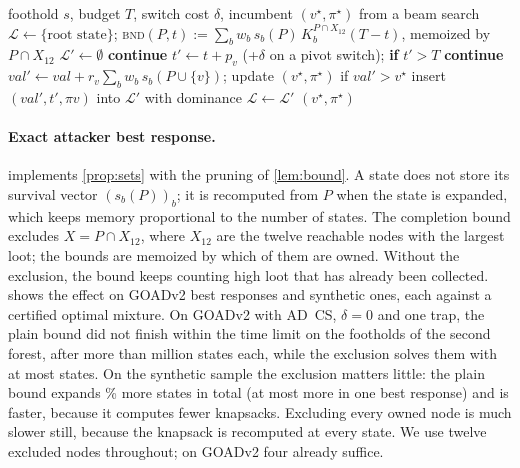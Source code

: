 \documentclass[runningheads]{llncs}
\begin{document}
\begin{algorithm}[t]
\caption{Exact attacker best response against a trap mixture $D=\{(w_b,B_b)\}$}\label{alg:dp}
\begin{algorithmic}[1]
\Require foothold $s$, budget $T$, switch cost $\delta$, incumbent $(v^\star,\pi^\star)$ from a beam search
\State $\mathcal L\gets\{\text{root state}\}$; \textsc{bnd}$(P,t)\mathrel{:=}\sum_b w_b\,s_b(P)\,K_b^{P\cap X_{12}}(T-t)$, memoized by $P\cap X_{12}$
  \State $\mathcal L'\gets\emptyset$
     \textbf{continue} \EndIf
      \State $t'\gets t+p_v$ (+$\delta$ on a pivot switch); \textbf{if} $t'>T$ \textbf{continue}
      \State $\mathit{val}'\gets\mathit{val}+r_v\sum_b w_b\,s_b(P\cup\{v\})$; update $(v^\star,\pi^\star)$ if $\mathit{val}'>v^\star$
       insert $(\mathit{val}',t',\pi v)$ into $\mathcal L'$ with dominance \EndIf
    \EndFor
  \EndFor
  \State $\mathcal L\gets\mathcal L'$
\EndWhile
\State \Return $(v^\star,\pi^\star)$ 
\end{algorithmic}
\end{algorithm}

\paragraph{Exact attacker best response.}
 implements \cref{prop:sets} with the pruning of \cref{lem:bound}. A state does not store its survival vector $(s_b(P))_b$; it is recomputed from $P$ when the state is expanded, which keeps memory proportional to the number of states. The completion bound excludes $X=P\cap X_{12}$, where $X_{12}$ are the twelve reachable nodes with the largest loot; the bounds are memoized by which of them are owned. Without the exclusion, the bound keeps counting high loot that has already been collected.  shows the effect on \AblGoadN{} GOADv2 best responses and \AblSynN{} synthetic ones, each against a certified optimal mixture. On GOADv2 with AD~CS, $\delta=0$ and one trap, the plain bound did not finish within the time limit on the \AblPlainFail{} footholds of the second forest, after more than \AblPlainFailStates{} million states each, while the exclusion solves them with at most \AblFailWithExcl{} states. On the synthetic sample the exclusion matters little: the plain bound expands \AblSynTotalDiff\% more states in total (at most \AblSynMaxAbsDiff{} more in one best response) and is faster, because it computes fewer knapsacks. Excluding every owned node is much slower still, because the knapsack is recomputed at every state. We use twelve excluded nodes throughout; on GOADv2 four already suffice.
\end{document}
